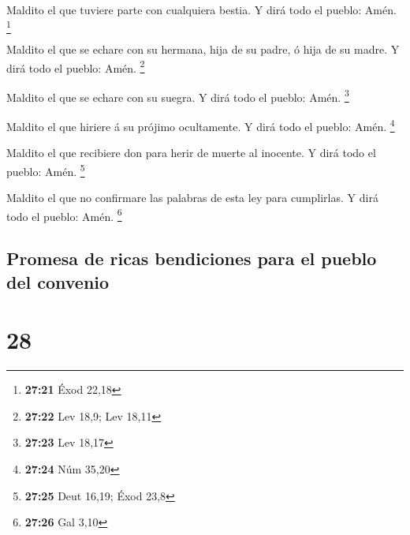  Maldito el que tuviere parte con cualquiera bestia. Y
dirá todo el pueblo: Amén. \footnote{\textbf{27:21} Éxod 22,18}

 Maldito el que se echare con su hermana, hija de su
padre, ó hija de su madre. Y dirá todo el pueblo: Amén. \footnote{\textbf{27:22}
  Lev 18,9; Lev 18,11}

 Maldito el que se echare con su suegra. Y dirá todo el
pueblo: Amén. \footnote{\textbf{27:23} Lev 18,17}

 Maldito el que hiriere á su prójimo ocultamente. Y dirá
todo el pueblo: Amén. \footnote{\textbf{27:24} Núm 35,20}

 Maldito el que recibiere don para herir de muerte al
inocente. Y dirá todo el pueblo: Amén. \footnote{\textbf{27:25} Deut
  16,19; Éxod 23,8}

 Maldito el que no confirmare las palabras de esta ley
para cumplirlas. Y dirá todo el pueblo: Amén. \footnote{\textbf{27:26}
  Gal 3,10}

\hypertarget{promesa-de-ricas-bendiciones-para-el-pueblo-del-convenio}{%
\subsection{Promesa de ricas bendiciones para el pueblo del
convenio}\label{promesa-de-ricas-bendiciones-para-el-pueblo-del-convenio}}

\hypertarget{section-27}{%
\section{28}\label{section-27}}

